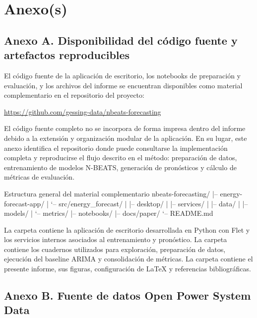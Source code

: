 \section{Anexo(s)}

\subsection{Anexo A. Disponibilidad del código fuente y artefactos reproducibles}

El código fuente de la aplicación de escritorio, los notebooks de preparación y evaluación, y los archivos del informe se encuentran disponibles como material complementario en el repositorio del proyecto:

\begin{center}
    \url{https://github.com/gessing-data/nbeats-forecasting}
\end{center}

El código fuente completo no se incorpora de forma impresa dentro del informe debido a la extensión y organización modular de la aplicación. En su lugar, este anexo identifica el repositorio donde puede consultarse la implementación completa y reproducirse el flujo descrito en el método: preparación de datos, entrenamiento de modelos N-BEATS, generación de pronósticos y cálculo de métricas de evaluación.

\begin{codeblock}{Estructura general del material complementario}
    nbeats-forecasting/
    |-- energy-forecast-app/
    |   `-- src/energy_forecast/
    |       |-- desktop/
    |       |-- services/
    |       |-- data/
    |       |-- models/
    |       `-- metrics/
    |-- notebooks/
    |-- docs/paper/
    `-- README.md
\end{codeblock}

La carpeta  contiene la aplicación de escritorio desarrollada en Python con Flet y los servicios internos asociados al entrenamiento y pronóstico. La carpeta  contiene los cuadernos utilizados para exploración, preparación de datos, ejecución del baseline ARIMA y consolidación de métricas. La carpeta  contiene el presente informe, sus figuras, configuración de \LaTeX{} y referencias bibliográficas.

\subsection{Anexo B. Fuente de datos Open Power System Data}

